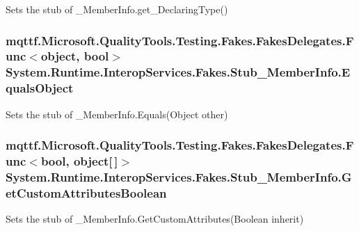 Sets the stub of \-\_\-\-Member\-Info.\-get\-\_\-\-Declaring\-Type()

\hypertarget{class_system_1_1_runtime_1_1_interop_services_1_1_fakes_1_1_stub___member_info_af76b839c3efbb21fea5adf8e1da6f23c}{
\subsubsection[{Equals\-Object}]{\setlength{\rightskip}{0pt plus 5cm}mqttf.\-Microsoft.\-Quality\-Tools.\-Testing.\-Fakes.\-Fakes\-Delegates.\-Func$<$object, bool$>$ System.\-Runtime.\-Interop\-Services.\-Fakes.\-Stub\-\_\-\-Member\-Info.\-Equals\-Object}}\label{class_system_1_1_runtime_1_1_interop_services_1_1_fakes_1_1_stub___member_info_af76b839c3efbb21fea5adf8e1da6f23c}


Sets the stub of \-\_\-\-Member\-Info.\-Equals(\-Object other)

\hypertarget{class_system_1_1_runtime_1_1_interop_services_1_1_fakes_1_1_stub___member_info_a44031408bc0b5d5a3336be36fb8faf2e}{
\subsubsection[{Get\-Custom\-Attributes\-Boolean}]{\setlength{\rightskip}{0pt plus 5cm}mqttf.\-Microsoft.\-Quality\-Tools.\-Testing.\-Fakes.\-Fakes\-Delegates.\-Func$<$bool, object\mbox{[}$\,$\mbox{]}$>$ System.\-Runtime.\-Interop\-Services.\-Fakes.\-Stub\-\_\-\-Member\-Info.\-Get\-Custom\-Attributes\-Boolean}}\label{class_system_1_1_runtime_1_1_interop_services_1_1_fakes_1_1_stub___member_info_a44031408bc0b5d5a3336be36fb8faf2e}


Sets the stub of \-\_\-\-Member\-Info.\-Get\-Custom\-Attributes(\-Boolean inherit)

